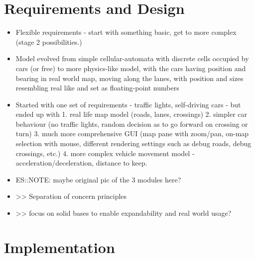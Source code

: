 \section{Requirements and Design}
\begin{itemize}
    \item Flexible requirements - start with something basic, get to more complex (stage 2 possibilities.)
    \item Model evolved from simple cellular-automata with discrete cells occupied by cars (or free) to more physics-like model, with the cars having position and bearing in real world map, moving along the lanes, with position and sizes resembling real like and set as floating-point numbers
    \item Started with one set of requirements - traffic lights, self-driving cars - but ended up with 1. real life map model (roads, lanes, crossings) 2. simpler car behaviour (no traffic lights, random decision as to go forward on crossing or turn) 3. much more comprehensive GUI (map pane with zoom/pan, on-map selection with mouse, different rendering settings such as debug roads, debug crossings, etc.) 4. more complex vehicle movement model - acceleration/deceleration, distance to keep.
	\item ES::NOTE: maybe original pic of the 3 modules here?
	\item >> Separation of concern principles
	\item >> focus on solid bases to enable expandability and real world usage?
\end{itemize}



\section{Implementation}


